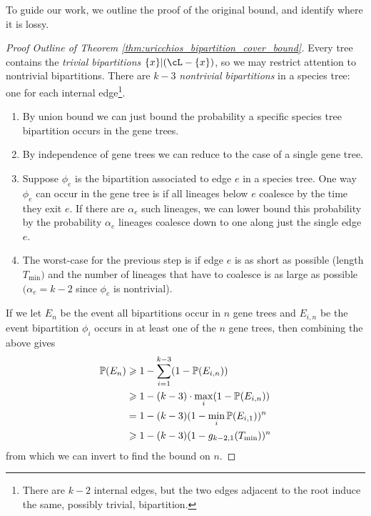 To guide our work, we outline the proof of the original bound, and identify where it is lossy.

\begin{proof}[Proof Outline of Theorem \ref{thm:uricchios_bipartition_cover_bound}]
Every tree contains the \emph{trivial bipartitions} $\{x\} | (\cL - \{x\})$, so we may
restrict attention to nontrivial bipartitions. There are $k-3$ \emph{nontrivial bipartitions} in a
species tree: one for each internal edge\footnote{There are $k-2$ internal edges, but the two
edges adjacent to the root induce the same, possibly trivial, bipartition.}.
\begin{enumerate}
    \item By union bound we can just bound the probability a specific species tree bipartition occurs in the gene trees.

    \item  By independence of gene trees we can reduce to the case of a single gene tree.

    \item Suppose $\phi_e$ is the bipartition associated to edge $e$ in a species tree. One way $\phi_e$ can occur in the gene tree is if all lineages below $e$ coalesce by the time they exit $e$. If there are $\alpha_e$ such lineages, we can lower bound this probability by the probability $\alpha_e$ lineages coalesce down to one along just the single edge $e$.

    \item The worst-case for the previous step is if edge $e$  is as short as possible (length $T_{\mathrm{min}})$ and the number of lineages that have to coalesce is as large as possible $(\alpha_e = k-2$ since $\phi_e$ is nontrivial).
\end{enumerate}

If we let $E_n$ be the event all bipartitions occur in $n$ gene trees and $E_{i,n}$ be the event bipartition $\phi_i$ occurs in at least one of the $n$ gene trees, then combining the above gives
%
\begin{align*}
    \P(E_n) & \geq 1 - \sum_{i=1}^{k-3} (1-\P(E_{i,n}))\\
    &  \geq 1 - (k-3)  \cdot \max_i (1-\P(E_{i,n})) \\
    & = 1 - (k-3) (1- \min_i \P(E_{i,1}))^n \\
    & \geq  1 - (k-3) (1- g_{k-2, 1}(T_{\mathrm{min}}))^n
\end{align*}
%
\noindent from which we can invert to find the bound on $n$.
\end{proof}



